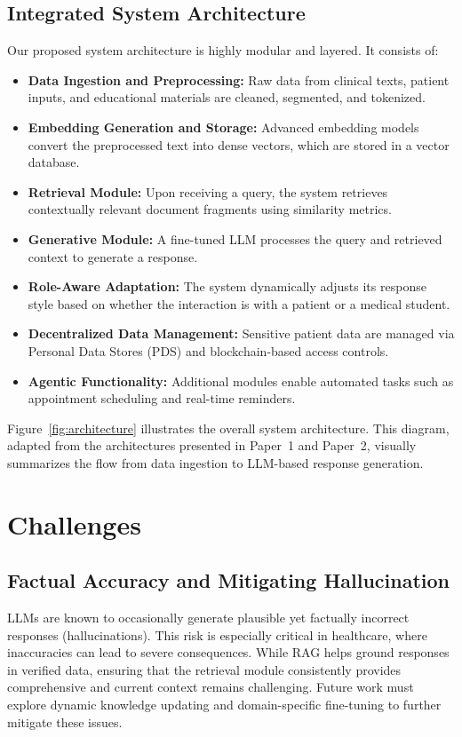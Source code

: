 \subsection{Integrated System Architecture}
Our proposed system architecture is highly modular and layered. It consists of:
\begin{itemize}
    \item \textbf{Data Ingestion and Preprocessing:} Raw data from clinical texts, patient inputs, and educational materials are cleaned, segmented, and tokenized.
    \item \textbf{Embedding Generation and Storage:} Advanced embedding models convert the preprocessed text into dense vectors, which are stored in a vector database.
    \item \textbf{Retrieval Module:} Upon receiving a query, the system retrieves contextually relevant document fragments using similarity metrics.
    \item \textbf{Generative Module:} A fine-tuned LLM processes the query and retrieved context to generate a response.
    \item \textbf{Role-Aware Adaptation:} The system dynamically adjusts its response style based on whether the interaction is with a patient or a medical student.
    \item \textbf{Decentralized Data Management:} Sensitive patient data are managed via Personal Data Stores (PDS) and blockchain-based access controls.
    \item \textbf{Agentic Functionality:} Additional modules enable automated tasks such as appointment scheduling and real-time reminders.
\end{itemize}

Figure~\ref{fig:architecture} illustrates the overall system architecture. This diagram, adapted from the architectures presented in Paper~1 and Paper~2, visually summarizes the flow from data ingestion to LLM-based response generation.


\section{Challenges}

\subsection{Factual Accuracy and Mitigating Hallucination}
LLMs are known to occasionally generate plausible yet factually incorrect responses (hallucinations). This risk is especially critical in healthcare, where inaccuracies can lead to severe consequences. While RAG helps ground responses in verified data, ensuring that the retrieval module consistently provides comprehensive and current context remains challenging. Future work must explore dynamic knowledge updating and domain-specific fine-tuning to further mitigate these issues.

